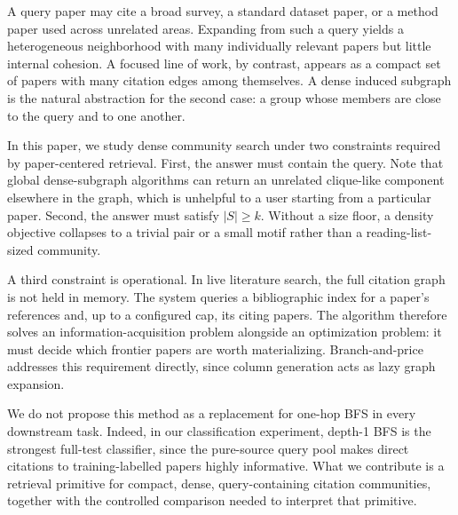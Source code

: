 \documentclass[12pt]{article}
\begin{document}
A query paper may cite a broad survey, a standard dataset paper, or a method paper used across unrelated areas.  Expanding from such a query yields a heterogeneous neighborhood with many individually relevant papers but little internal cohesion.  A focused line of work, by contrast, appears as a compact set of papers with many citation edges among themselves.  A dense induced subgraph is the natural abstraction for the second case: a group whose members are close to the query and to one another.

In this paper, we study dense community search under two constraints required by paper-centered retrieval.  First, the answer must contain the query.  Note that global dense-subgraph algorithms can return an unrelated clique-like component elsewhere in the graph, which is unhelpful to a user starting from a particular paper.  Second, the answer must satisfy $|S|\ge k$.  Without a size floor, a density objective collapses to a trivial pair or a small motif rather than a reading-list-sized community.

A third constraint is operational.  In live literature search, the full citation graph is not held in memory.  The system queries a bibliographic index for a paper's references and, up to a configured cap, its citing papers.  The algorithm therefore solves an information-acquisition problem alongside an optimization problem: it must decide which frontier papers are worth materializing.  Branch-and-price addresses this requirement directly, since column generation acts as lazy graph expansion.

We do not propose this method as a replacement for one-hop BFS in every downstream task.  Indeed, in our classification experiment, depth-1 BFS is the strongest full-test classifier, since the pure-source query pool makes direct citations to training-labelled papers highly informative.  What we contribute is a retrieval primitive for compact, dense, query-containing citation communities, together with the controlled comparison needed to interpret that primitive.
\end{document}
